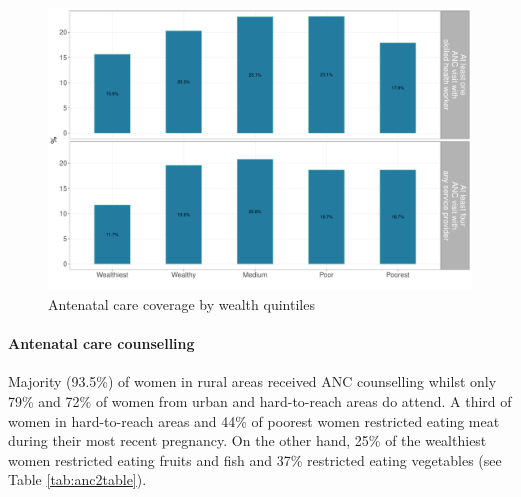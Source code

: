 \documentclass[12pt,a4paper]{article}
\let\oldparagraph\paragraph
\renewcommand{\paragraph}[1]{\oldparagraph{#1}\mbox{}}
\begin{document}
\begin{figure}[H]

{\centering \includegraphics{kayinReport_files/figure-latex/anc2plot-1} 

}

\caption{Antenatal care coverage by wealth quintiles}\label{fig:anc2plot}
\end{figure}

\hypertarget{ancCounselling}{%
\paragraph{Antenatal care counselling}\label{ancCounselling}}

Majority (93.5\%) of women in rural areas received ANC counselling whilst only 79\% and 72\% of women from urban and hard-to-reach areas do attend. A third of women in hard-to-reach areas and 44\% of poorest women restricted eating meat during their most recent pregnancy. On the other hand, 25\% of the wealthiest women restricted eating fruits and fish and 37\% restricted eating vegetables (see Table \ref{tab:anc2table}).
\end{document}
